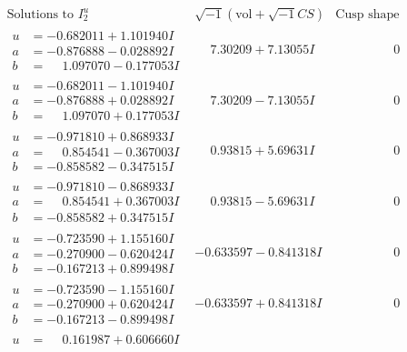 \documentclass[1p]{elsarticle_modified}
\theoremstyle{definition}
\newcommand{\I}{\sqrt{-1}}
\begin{document}
$$\begin{array}{c|c|c}
\text{Solutions to }I^u_{2}& \I (\text{vol} + \sqrt{-1}CS) & \text{Cusp shape}\\
 \hline 
\begin{aligned}
u &= -0.682011 + 1.101940 I \\
a &= -0.876888 - 0.028892 I \\
b &= \phantom{-}1.097070 - 0.177053 I\end{aligned}
 & \phantom{-}7.30209 + 7.13055 I & \phantom{-0.000000 } 0 \\ \hline\begin{aligned}
u &= -0.682011 - 1.101940 I \\
a &= -0.876888 + 0.028892 I \\
b &= \phantom{-}1.097070 + 0.177053 I\end{aligned}
 & \phantom{-}7.30209 - 7.13055 I & \phantom{-0.000000 } 0 \\ \hline\begin{aligned}
u &= -0.971810 + 0.868933 I \\
a &= \phantom{-}0.854541 - 0.367003 I \\
b &= -0.858582 - 0.347515 I\end{aligned}
 & \phantom{-}0.93815 + 5.69631 I & \phantom{-0.000000 } 0 \\ \hline\begin{aligned}
u &= -0.971810 - 0.868933 I \\
a &= \phantom{-}0.854541 + 0.367003 I \\
b &= -0.858582 + 0.347515 I\end{aligned}
 & \phantom{-}0.93815 - 5.69631 I & \phantom{-0.000000 } 0 \\ \hline\begin{aligned}
u &= -0.723590 + 1.155160 I \\
a &= -0.270900 - 0.620424 I \\
b &= -0.167213 + 0.899498 I\end{aligned}
 & -0.633597 - 0.841318 I & \phantom{-0.000000 } 0 \\ \hline\begin{aligned}
u &= -0.723590 - 1.155160 I \\
a &= -0.270900 + 0.620424 I \\
b &= -0.167213 - 0.899498 I\end{aligned}
 & -0.633597 + 0.841318 I & \phantom{-0.000000 } 0 \\ \hline\begin{aligned}
u &= \phantom{-}0.161987 + 0.606660 I \\

\end{aligned}
\end{array}$$
\end{document}
